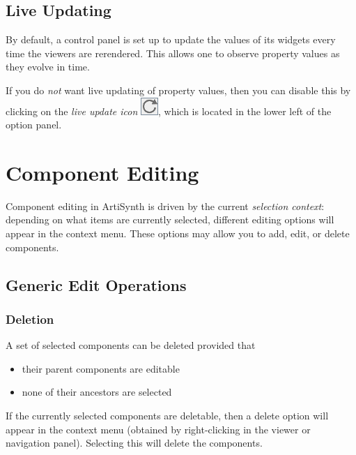 \documentclass{article}
\begin{document}
\subsection{Live Updating}

By default, a control panel is set up to update the values of its
widgets every time the viewers are rerendered. This allows one to
observe property values as they evolve in time.

If you do {\it not} want live updating of property values, then you can
disable this by clicking on the {\it live update icon}
\includegraphics{images/liveUpdateIcon}, which is located in the lower left of the
option panel.

\section{Component Editing}
\label{componentEditingSec}

\setjavabase{}

Component editing in ArtiSynth is driven by the current {\it selection
context}: depending on what items are currently selected, different
editing options will appear in the context menu. These options may
allow you to add, edit, or delete components.


\subsection{Generic Edit Operations}

\subsubsection{Deletion}

A set of selected components can be deleted provided that 

\begin{itemize}

\item their parent components are editable 

\item none of their ancestors are selected

\end{itemize}

If the currently selected components are deletable, then a {\sf delete}
option will appear in the context menu (obtained by right-clicking in
the viewer or navigation panel). Selecting this will delete the
components.
\end{document}
